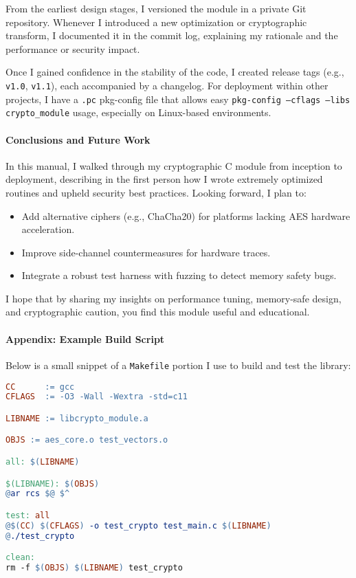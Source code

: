 From the earliest design stages, I versioned the module in a private Git repository. Whenever I introduced a new optimization or cryptographic transform, I documented it in the commit log, explaining my rationale and the performance or security impact.

Once I gained confidence in the stability of the code, I created release tags (e.g., \texttt{v1.0}, \texttt{v1.1}), each accompanied by a changelog. For deployment within other projects, I have a \texttt{.pc} pkg-config file that allows easy \texttt{pkg-config --cflags --libs crypto\_module} usage, especially on Linux-based environments.

\paragraph{Conclusions and Future Work}

In this manual, I walked through my cryptographic C module from inception to deployment, describing in the first person how I wrote extremely optimized routines and upheld security best practices. Looking forward, I plan to:

\begin{itemize}
	\item Add alternative ciphers (e.g., ChaCha20) for platforms lacking AES hardware acceleration.
	\item Improve side-channel countermeasures for hardware traces.
	\item Integrate a robust test harness with fuzzing to detect memory safety bugs.
\end{itemize}

I hope that by sharing my insights on performance tuning, memory-safe design, and cryptographic caution, you find this module useful and educational.

\paragraph{Appendix: Example Build Script}

Below is a small snippet of a \texttt{Makefile} portion I use to build and test the library:

\begin{lstlisting}[language=make]
CC      := gcc
CFLAGS  := -O3 -Wall -Wextra -std=c11

LIBNAME := libcrypto_module.a

OBJS := aes_core.o test_vectors.o

all: $(LIBNAME)

$(LIBNAME): $(OBJS)
@ar rcs $@ $^

test: all
@$(CC) $(CFLAGS) -o test_crypto test_main.c $(LIBNAME)
@./test_crypto

clean:
rm -f $(OBJS) $(LIBNAME) test_crypto
\end{lstlisting}

